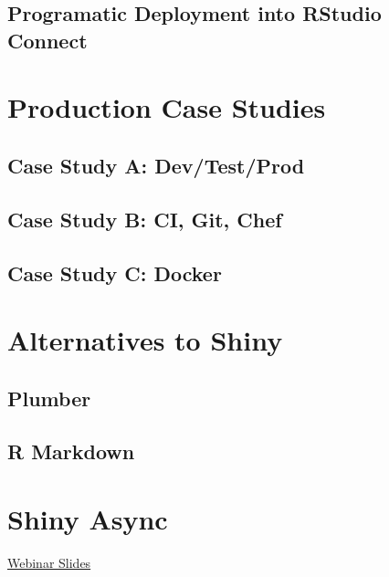 \documentclass[]{book}
\theoremstyle{definition}
\theoremstyle{definition}
\theoremstyle{definition}
\theoremstyle{remark}
\begin{document}
\hypertarget{programatic-deployment-into-rstudio-connect}{%
\section{Programatic Deployment into RStudio
Connect}\label{programatic-deployment-into-rstudio-connect}}

\hypertarget{production-case-studies}{%
\chapter{Production Case Studies}\label{production-case-studies}}

\hypertarget{case-study-a-devtestprod}{%
\section{Case Study A: Dev/Test/Prod}\label{case-study-a-devtestprod}}

\hypertarget{case-study-b-ci-git-chef}{%
\section{Case Study B: CI, Git, Chef}\label{case-study-b-ci-git-chef}}

\hypertarget{case-study-c-docker}{%
\section{Case Study C: Docker}\label{case-study-c-docker}}

\hypertarget{alternatives-to-shiny}{%
\chapter{Alternatives to Shiny}\label{alternatives-to-shiny}}

\hypertarget{plumber}{%
\section{Plumber}\label{plumber}}

\hypertarget{r-markdown}{%
\section{R Markdown}\label{r-markdown}}

\hypertarget{shiny-async}{%
\chapter{Shiny Async}\label{shiny-async}}

\href{https://github.com/rstudio/webinars/blob/master/56-scaling-shiny-apps/Scaling\%20Shiny\%20apps\%20with\%20async\%20programming.pdf}{Webinar
Slides}
\end{document}
